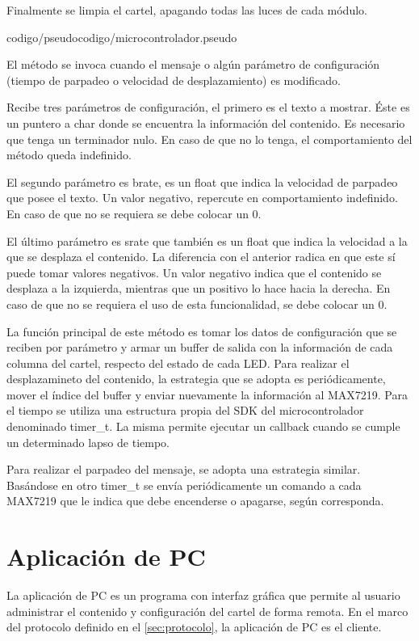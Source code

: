 Finalmente se limpia el cartel, apagando todas las luces de cada módulo.

 {codigo/pseudocodigo/microcontrolador.pseudo}

El método  se invoca cuando el mensaje o algún parámetro de configuración (tiempo de parpadeo o velocidad de desplazamiento) es modificado.

Recibe tres parámetros de configuración, el primero es el texto a mostrar.
Éste es un puntero a char donde se encuentra la información del contenido.
Es necesario que tenga un terminador nulo.
En caso de que no lo tenga, el comportamiento del método queda indefinido.

El segundo parámetro es brate, es un float que indica la velocidad de parpadeo que posee el texto.
Un valor negativo, repercute en comportamiento indefinido.
En caso de que no se requiera se debe colocar un 0.

El último parámetro es srate que también es un float que indica la velocidad a la que se desplaza el contenido.
La diferencia con el anterior radica en que este sí puede tomar valores negativos.
Un valor negativo indica que el contenido se desplaza a la izquierda, mientras que un positivo lo hace hacia la derecha.
En caso de que no se requiera el uso de esta funcionalidad, se debe colocar un 0. 

La función principal de este método es tomar los datos de configuración que se reciben por parámetro y armar un buffer de salida con la información de cada columna del cartel, respecto del estado de cada LED.
Para realizar el desplazamineto del contenido, la estrategia que se adopta es periódicamente, mover el índice del buffer y enviar nuevamente la información al MAX7219.
Para el tiempo se utiliza una estructura propia del SDK del microcontrolador denominado timer\_t.
La misma permite ejecutar un callback cuando se cumple un determinado lapso de tiempo.

Para realizar el parpadeo del mensaje, se adopta una estrategia similar.
Basándose en otro timer\_t se envía periódicamente un comando a cada MAX7219 que le indica que debe encenderse o apagarse, según corresponda.

\section{Aplicación de PC}\label{sec:pc}
La aplicación de PC es un programa con interfaz gráfica que permite al usuario administrar el contenido y configuración del cartel de forma remota. En el marco del protocolo definido en el \ref{sec:protocolo}, la aplicación de PC es el cliente.

